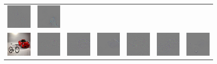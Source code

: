 \begin{figure}
\begin{center}
\begin{tabular}{c||ccc||ccc}
\includegraphics[width=0.13\linewidth]{figs/examples/googlenet/deconv/dog-cat4_diff_286} &
\includegraphics[width=0.13\linewidth]{figs/examples/googlenet/soft/dog-cat4_diff_286} \\
\includegraphics[width=0.13\linewidth]{figs/examples/googlenet/oxford/bic-car1} &
\includegraphics[width=0.13\linewidth]{figs/examples/googlenet/oxford/bic-car1_diff_818} &
\includegraphics[width=0.13\linewidth]{figs/examples/googlenet/deconv/bic-car1_diff_818} &
\includegraphics[width=0.13\linewidth]{figs/examples/googlenet/soft/bic-car1_diff_818} &
\includegraphics[width=0.13\linewidth]{figs/examples/googlenet/oxford/bic-car1_diff_672} &
\includegraphics[width=0.13\linewidth]{figs/examples/googlenet/deconv/bic-car1_diff_672} &
\includegraphics[width=0.13\linewidth]{figs/examples/googlenet/soft/bic-car1_diff_672} \\

\end{tabular}
\end{center}
\end{figure}
